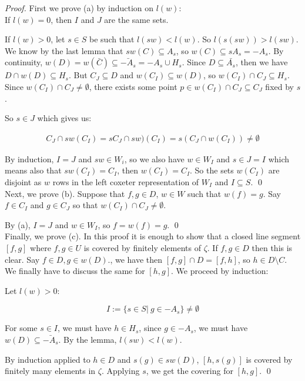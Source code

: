 \begin{proof}
  First we prove (a) by induction on $l(w)$:\\

  If $l(w) = 0$, then $I$ and $J$ are the same sets.

  If $l(w) > 0$, let $s \in S$ be such that $l(sw) < l(w)$. So $l(s(sw)) > l(sw)$. We know by the last lemma that $sw(C) \subseteq A_s$, so $w(C) \subseteq sA_s = -A_s$. By continuity, $w(D) = w(\bar{C}) \subseteq \bar{-A_s} = -A_s \cup H_s$. Since $D \subseteq \bar{A_s}$, then we have $D\cap w(D) \subseteq H_s$. But $C_J \subseteq D$ and $w(C_I) \subseteq w(D)$, so $w(C_I) \cap C_J \subseteq H_s$. Since $w(C_I) \cap C_J \neq \emptyset$, there exists some point $p \in w(C_I) \cap C_J \subseteq C_J$ fixed by $s$.

  So $s \in J$ which gives us:

  \begin{equation}
    \begin{split}
      C_J\cap sw(C_I) = sC_J \cap sw)(C_I) = s(C_J \cap w(C_I)) \neq \emptyset
    \end{split}
  \end{equation}

  By induction, $I = J$ and $sw \in W_i$, so we also have $w \in W_I$ and $s \in J = I$ which means also that $sw(C_I) = C_I$, then $w(C_I) = C_I$. So the sets $w(C_I)$ are disjoint as $w$ rows in the left coxeter representation of $W_I$ and $I \subseteq S$. \qed\\


  Next, we prove (b).
  Suppose that $f,g \in D$, $w\in W$ such that $w(f) = g$. Say $f \in C_I$ and $g \in C_J$ so that $w(C_I) \cap C_J \neq \emptyset$.

  By (a), $I = J$ and $w \in W_I$, so $f = w(f) = g$. \qed\\

  Finally, we prove (c). In this proof it is enough to show that a closed line segment $[f,g]$ where $f,g \in U$ is covered by finitely elements of $\zeta$. If $f,g \in D$ then this is clear. Say $f \in D, g \in w(D)$., we have then $[f,g] \cap D = [f,h]$, so $h \in D \setminus C$. We finally have to discuss the same for $[h,g]$. We proceed by induction:

  Let $l(w) > 0$:

  \begin{equation}
    I := \{s \in S|\ g \in -A_s\} \neq \emptyset
  \end{equation}

For some $s \in I$, we must have $h \in H_s$, since $g \in -A_s$, we must have $w(D) \subseteq \bar{-A_s}$. By the lemma, $l(sw) < l(w)$.

By induction applied to $h\in D$ and $s(g) \in sw(D)$, $[h,s(g)]$ is covered by finitely many elements in $\zeta$. Applying $s$, we get the covering for $[h,g]$. \qed
\end{proof}

